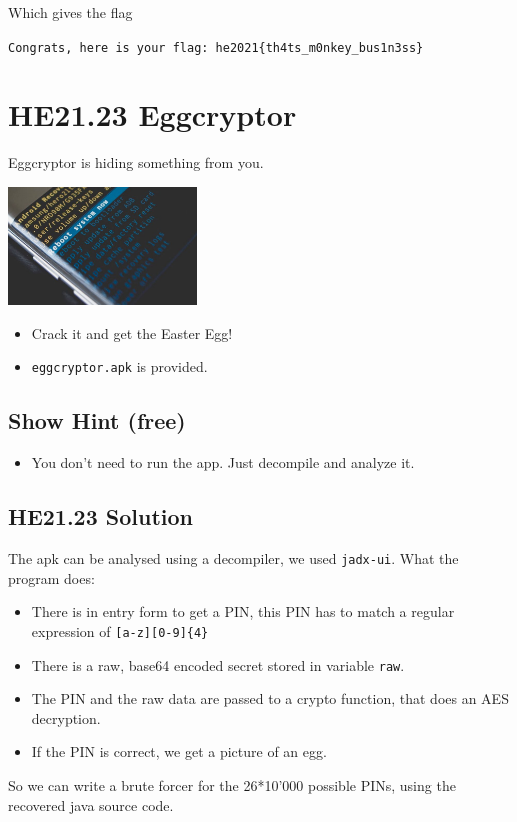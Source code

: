 \documentclass[english,a4paper,nols,noindent]{tufte-handout}
\begin{document}
\noindent Which gives the flag 

\noindent\verb+Congrats, here is your flag: he2021{th4ts_m0nkey_bus1n3ss}+

\hypertarget{he21.23}{%
  \section{HE21.23 Eggcryptor}
  \label{he21.23}}
\noindent Eggcryptor is hiding something from you.

\begin{marginfigure}
    \includegraphics[width=50mm]{images/challenge23.jpg}
\end{marginfigure}

\begin{itemize}
\item Crack it and get the Easter Egg!
\item\verb+eggcryptor.apk+ is provided.
\end{itemize}
\subsection{Show Hint (free)}
\begin{itemize}
\item You don't need to run the app. Just decompile and analyze it.
\end{itemize}


\hypertarget{he21.23-solution}{%
\subsection{HE21.23 Solution}\label{he21.23-solution}}

\noindent The apk can be analysed using a decompiler, we used \verb+jadx-ui+.
What the program does:

\begin{itemize} 
    \item There is in entry form to get a PIN, this PIN has to match a regular
        expression of \verb+[a-z][0-9]{4}+
    \item There is a raw, base64 encoded secret stored in variable \verb+raw+.
    \item The PIN and the raw data are passed to a crypto function, that does
        an AES decryption.
    \item If the PIN is correct, we get a picture of an egg.
\end{itemize}
So we can write a brute forcer for the 26*10'000 possible PINs, using the recovered java source code.
\end{document}
